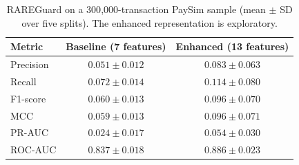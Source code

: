 \begin{table}[t]
\centering
\caption{RAREGuard on a 300{,}000-transaction PaySim sample (mean $\pm$ SD over five splits). The enhanced representation is exploratory.}
\label{tab:paysim}
\small
\begin{tabular}{lcc}
\toprule
Metric & Baseline (7 features) & Enhanced (13 features) \\
\midrule
Precision & $0.051\pm0.012$ & $0.083\pm0.063$ \\
Recall & $0.072\pm0.014$ & $0.114\pm0.080$ \\
F1-score & $0.060\pm0.013$ & $0.096\pm0.070$ \\
MCC & $0.059\pm0.013$ & $0.096\pm0.071$ \\
PR-AUC & $0.024\pm0.017$ & $0.054\pm0.030$ \\
ROC-AUC & $0.837\pm0.018$ & $0.886\pm0.023$ \\
\bottomrule
\end{tabular}
\end{table}
